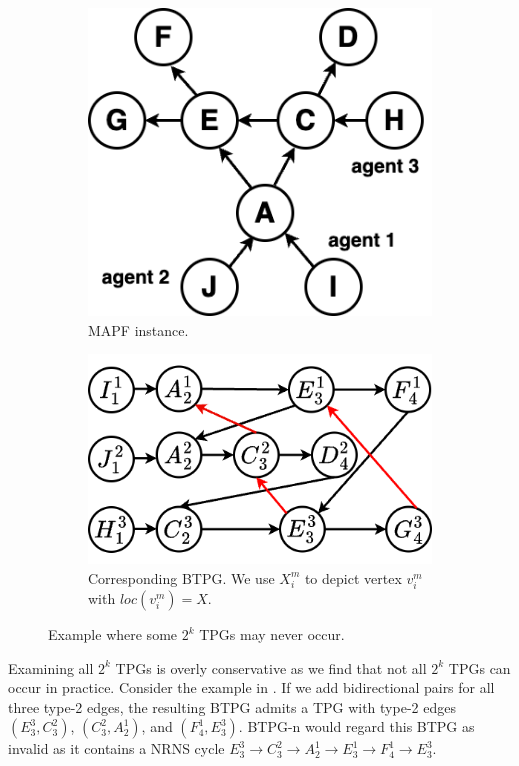 \documentclass[letterpaper]{article} %
\theoremstyle{definition}
\begin{document}
\begin{figure}[t]
\begin{subfigure}[a]{0.4\linewidth}
\centering
\includegraphics[width=0.87\linewidth]{Figs/examplePath.png}
\caption{MAPF instance.}
\label{fig: example path}
\end{subfigure}
\hfill
\begin{subfigure}[a]{0.59\linewidth}
\centering
\includegraphics[width=.9\linewidth]{Figs/exampleBTPG.png}
\caption{Corresponding BTPG. We use $X_i^m$ to depict vertex $v_i^m$ with $loc(v_i^m)=X$.}
\label{fig: example BTPG}
\end{subfigure}

\caption{Example where some $2^k$ TPGs may never occur.}\label{fig:counter-example}
\end{figure}


Examining all $2^k$ TPGs is overly conservative as we find that not all $2^k$ TPGs can occur in practice. Consider the example in . If we add bidirectional pairs for all three type-2 edges, the resulting BTPG admits a TPG with type-2 edges $(E^3_3,C_3^2)$, $(C_3^2,A_2^1)$, and $(F^1_4,E^3_3)$. BTPG-n would regard this BTPG as invalid as it contains a NRNS cycle $E^3_3 \rightarrow C^2_3 \rightarrow A^1_2  \rightarrow E^1_3 \rightarrow F^1_4 \rightarrow E^3_3$.
\end{document}
